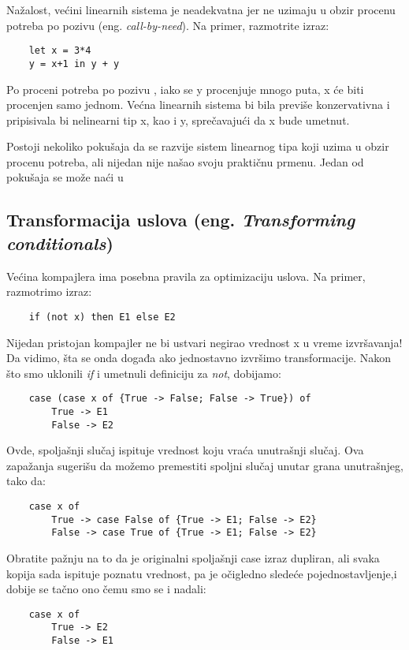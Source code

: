 Nažalost, većini linearnih sistema je neadekvatna jer ne uzimaju u obzir procenu potreba po pozivu (eng. \emph{call-by-need}). Na primer, 
razmotrite izraz:
\begin{verbatim}
	let x = 3*4
	y = x+1 in y + y
\end{verbatim}
Po proceni potreba po pozivu , iako se y procenjuje mnogo puta, x će biti procenjen samo jednom. Većna linearnih 
sistema bi bila previše konzervativna i pripisivala bi nelinearni tip x, kao i y, sprečavajući da x bude umetnut.

Postoji nekoliko pokušaja da se razvije sistem linearnog tipa koji uzima u obzir procenu potreba, ali nijedan nije našao svoju praktičnu prmenu. Jedan od pokušaja se može naći u \cite{transformation-based-optimiser-Haskell} 


\subsection {Transformacija uslova (eng.  \emph{Transforming conditionals})}
\label{sec:podnaslovTransformation}

Većina kompajlera ima posebna pravila za optimizaciju uslova. Na primer, razmotrimo izraz:
\begin{verbatim}
	if (not x) then E1 else E2
\end{verbatim}
Nijedan pristojan kompajler ne bi ustvari negirao vrednost x u vreme izvršavanja! Da vidimo, šta se onda događa ako jednostavno 
izvršimo transformacije. Nakon što smo uklonili \textit{if} i umetnuli definiciju za \textit{not}, dobijamo:
\begin{verbatim}
	case (case x of {True -> False; False -> True}) of
		True -> E1
		False -> E2
\end{verbatim}
Ovde, spoljašnji slučaj ispituje vrednost koju vraća unutrašnji slučaj. Ova zapažanja sugerišu da možemo premestiti spoljni slučaj 
unutar grana unutrašnjeg, tako da:
\begin{verbatim}
	case x of
		True -> case False of {True -> E1; False -> E2}
		False -> case True of {True -> E1; False -> E2}
\end{verbatim}

Obratite pažnju na to da je originalni spoljašnji case izraz dupliran, ali svaka kopija sada ispituje poznatu vrednost, pa je 
očigledno sledeće pojednostavljenje,i dobije se tačno ono čemu smo se i nadali:
\begin{verbatim}
	case x of
		True -> E2
		False -> E1
\end{verbatim}

